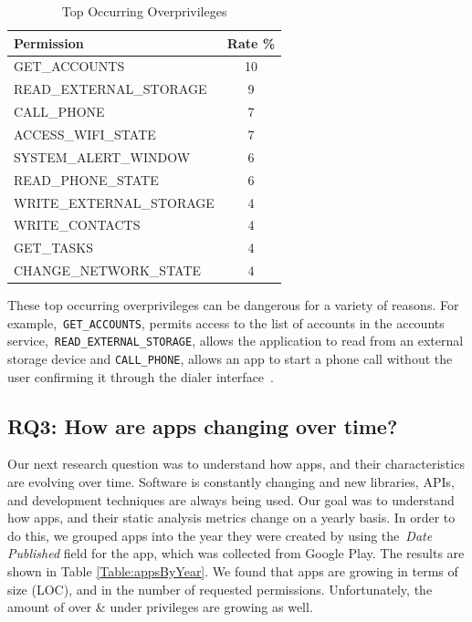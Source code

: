 \documentclass{sig-alternate}
\newcommand{\todo}[1]{\textcolor{cyan}{\textbf{[#1]}}}
\begin{document}
\begin{table}[ht]
\begin{center}
\caption{Top Occurring Overprivileges}
\label{Table:topOverPrivs}
 \begin{tabular}{ | l | c | } \hline

  \bfseries Permission & \bfseries Rate  \% \\ \hline
	
	GET\_ACCOUNTS  & 10 \\ \hline
	READ\_EXTERNAL\_STORAGE & 9 \\ \hline
	CALL\_PHONE  & 7 \\ \hline
	ACCESS\_WIFI\_STATE & 7 \\ \hline
	SYSTEM\_ALERT\_WINDOW & 6 \\ \hline
	READ\_PHONE\_STATE  & 6 \\ \hline
	WRITE\_EXTERNAL\_STORAGE  & 4 \\ \hline
	WRITE\_CONTACTS  & 4 \\ \hline
	GET\_TASKS & 4 \\ \hline
	CHANGE\_NETWORK\_STATE  & 4 \\ \hline
	 	
  \end{tabular}
\end{center}
\end{table}

\vspace{5mm}
These top occurring overprivileges can be dangerous for a variety of reasons. For example,~\texttt{GET\_ACCOUNTS}, permits access to the list of accounts in the accounts service,~\texttt{READ\_EXTERNAL\_STORAGE}, allows the application to read from an external storage device and \texttt{CALL\_PHONE}, allows an app to start a phone call without the user confirming it through the dialer interface~\cite{manifest_url}.




\subsection{RQ3: How are apps changing over time?}
Our next research question was to understand how apps, and their characteristics are evolving over time. Software is constantly changing and new libraries, APIs, and development techniques are always being used. Our goal was to understand how apps, and their static analysis metrics change on a yearly basis. In order to do this, we grouped apps into the year they were created by using the~\emph{Date Published} field for the app, which was collected from Google Play. The results are shown in Table \ref{Table:appsByYear}. We found that apps are growing in terms of size (LOC), and in the number of requested permissions. Unfortunately, the amount of over \& under privileges are growing as well.
\end{document}
